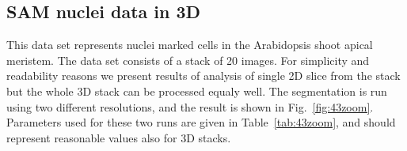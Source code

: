 \documentclass[a4paper,12pt]{article}
\begin{document}
\subsection{SAM nuclei data in 3D}
This data set represents nuclei marked cells in the Arabidopsis shoot apical
meristem. The data set consists of a stack of 20 images. For simplicity and readability reasons we present results of analysis of single 2D slice from the stack but the whole 3D stack can be processed equaly well. The
segmentation is run using two different resolutions, and the result is shown in Fig.~\ref{fig:43zoom}. Parameters used for these two runs are given in Table~\ref{tab:43zoom}, and should represent reasonable values also for 3D stacks.
\begin{figure}[h!]
\begin{center}
\\
\end{center}
\end{figure}
\end{document}

